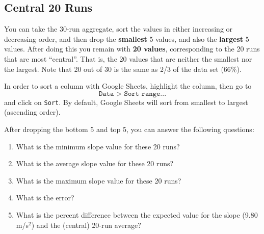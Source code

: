 \subsection{Central 20 Runs} \label{sec:01.central.20}
You can take the 30-run aggregate, sort the values in either increasing or decreasing order, and then drop the \textbf{smallest} 5 values, and also the \textbf{largest} 5 values. After doing this you remain with \textbf{20 values}, corresponding to the 20 runs that are most ``central''. That is, the 20 values that are neither the smallest nor the largest. Note that 20 out of 30 is the same as 2/3 of the data set (66\%).

In order to sort a column with Google Sheets, highlight the column, then go to
\begin{equation}
    \texttt{Data > Sort range...}
\end{equation}
and click on \texttt{Sort}. By default, Google Sheets will sort from smallest to largest (ascending order).

After dropping the bottom 5 and top 5, you can answer the following questions:
\begin{enumerate}
    \item What is the minimum slope value for these 20 runs?
    \item What is the average slope value for these 20 runs?
    \item What is the maximum slope value for these 20 runs?
    \item What is the error?
    \item What is the percent difference between the expected value for the slope (9.80 m/s$^{2}$) and the (central) 20-run average?
\end{enumerate} 
